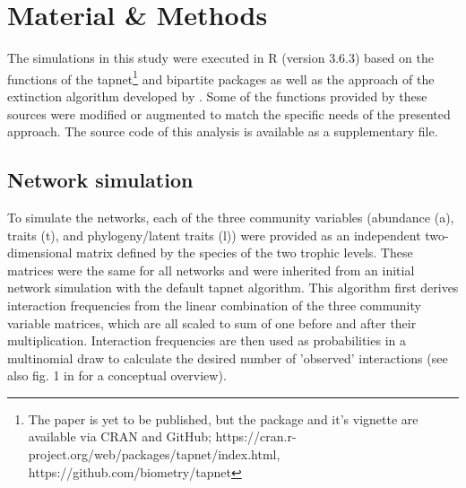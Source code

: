\documentclass[12pt,a4paper]{article}
\begin{document}
\newpage

	\section{Material \& Methods}
	The simulations in this study were executed in R \parencite{Rcore} (version 3.6.3) based on the functions of the tapnet\footnote{The paper is yet to be published, but the package and it's vignette are available via CRAN and GitHub; https://cran.r-project.org/web/packages/tapnet/index.html, https://github.com/biometry/tapnet} \parencite{Benadi} and bipartite \parencite{Dormann2008} packages as well as the approach of the extinction algorithm developed by \citeauthor{Vizentin-Bugoni2019} \parencite{Vizentin-Bugoni2019}. Some of the functions provided by these sources were modified or augmented to match the specific needs of the presented approach. The source code of this analysis is available as a supplementary file. \par



	\subsection{Network simulation} \label{sec:net_sim}
To simulate the networks, each of the three community variables (abundance (a), traits (t), and phylogeny/latent traits (l)) were provided as an independent two-dimensional matrix defined by the species of the two trophic levels. These matrices were the same for all networks and were inherited from an initial network simulation with the default tapnet algorithm. This algorithm first derives interaction frequencies from the linear combination of the three community variable matrices, which are all scaled to sum of one before and after their multiplication. Interaction frequencies are then used as probabilities in a multinomial draw to calculate the desired number of 'observed' interactions (see also fig. 1 in \cite{Benadi} for a conceptual overview).	
	
\end{document}
